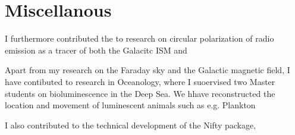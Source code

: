 \section{Miscellanous}
I furthermore contributed the to research on circular polarization of radio emission as a tracer of both the Galacitc ISM and  \par
Apart from my research on the Faraday sky and the Galactic magnetic field, I have contibuted to research in Oceanology, where I suoervised two Master students on bioluminescence in the Deep Sea.
We hhave reconstructed the location and movement of luminescent animals such as e.g. Plankton  \par
I also contributed to the technical development of the Nifty package,
